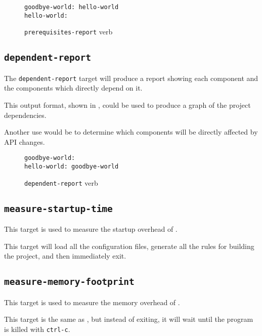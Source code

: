 \begin{figure}[tbh]
\hrulefill
\begin{verbatim}
goodbye-world: hello-world
hello-world:
\end{verbatim}
\hrulefill
\caption{\texttt{prerequisites-report} verb}\label{usinglmsbw:prerequisites-verb}
\end{figure}


\subsection{\texttt{dependent-report}}\label{usinglmsbw:dependent-report}

The \texttt{dependent-report} target will produce a report showing
each component and the components which directly depend on it.

This output format, shown in ,
could be used to produce a graph of the project dependencies.

Another use would be to determine which components will be directly
affected by API changes.

\begin{figure}[tbh]
\hrulefill
\begin{verbatim}
goodbye-world:
hello-world: goodbye-world
\end{verbatim}
\hrulefill
\caption{\texttt{dependent-report} verb}\label{usinglmsbw:dependents-verb}
\end{figure}


\subsection{\texttt{measure-startup-time}}\label{usinglmsbw:measure-startup-time}

This target is used to measure the startup overhead of \lmsbw.

This target will load all the configuration files, generate all the
rules for building the project, and then immediately exit.

\subsection{\texttt{measure-memory-footprint}}

This target is used to measure the memory overhead of \lmsbw.

This target is the same as , but
instead of exiting, it will wait until the program is killed with
\texttt{ctrl-c}.

